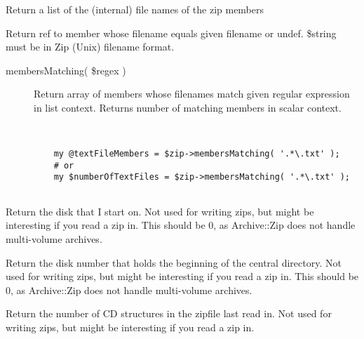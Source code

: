 \documentclass[]{article}
\renewcommand{\emph}[1]{\underline{#1}}
\begin{document}
\begin{description}
\itemsep1pt\parskip0pt
\item[\emph{memberNames()}]
Return a list of the (internal) file names of the zip members
\end{description}

\begin{description}
\itemsep1pt\parskip0pt
\item[memberNamed( \$string )]
Return ref to member whose filename equals given filename or undef.
\$string must be in Zip (Unix) filename format.
\end{description}

\begin{description}
\item[membersMatching( \$regex )]
Return array of members whose filenames match given regular expression
in list context. Returns number of matching members in scalar context.

~

\begin{verbatim}
    my @textFileMembers = $zip->membersMatching( '.*\.txt' );
    # or
    my $numberOfTextFiles = $zip->membersMatching( '.*\.txt' );
    
\end{verbatim}
\end{description}

\begin{description}
\itemsep1pt\parskip0pt
\item[\emph{diskNumber()}]
Return the disk that I start on. Not used for writing zips, but might be
interesting if you read a zip in. This should be 0, as Archive::Zip does
not handle multi-volume archives.
\end{description}

\begin{description}
\itemsep1pt\parskip0pt
\item[\emph{diskNumberWithStartOfCentralDirectory()}]
Return the disk number that holds the beginning of the central
directory. Not used for writing zips, but might be interesting if you
read a zip in. This should be 0, as Archive::Zip does not handle
multi-volume archives.
\end{description}

\begin{description}
\itemsep1pt\parskip0pt
\item[\emph{numberOfCentralDirectoriesOnThisDisk()}]
Return the number of CD structures in the zipfile last read in. Not used
for writing zips, but might be interesting if you read a zip in.
\end{description}
\end{document}
